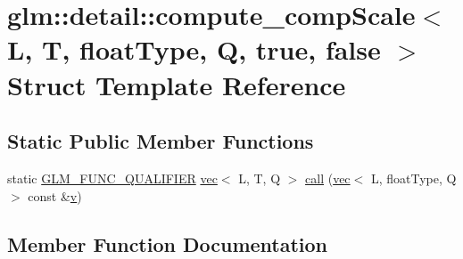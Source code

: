 \hypertarget{structglm_1_1detail_1_1compute__comp_scale_3_01_l_00_01_t_00_01float_type_00_01_q_00_01true_00_01false_01_4}{}\section{glm\+:\+:detail\+:\+:compute\+\_\+comp\+Scale$<$ L, T, float\+Type, Q, true, false $>$ Struct Template Reference}
\label{structglm_1_1detail_1_1compute__comp_scale_3_01_l_00_01_t_00_01float_type_00_01_q_00_01true_00_01false_01_4}
\subsection*{Static Public Member Functions}
\begin{DoxyCompactItemize}
\item 
static \mbox{\hyperlink{setup_8hpp_a33fdea6f91c5f834105f7415e2a64407}{G\+L\+M\+\_\+\+F\+U\+N\+C\+\_\+\+Q\+U\+A\+L\+I\+F\+I\+ER}} \mbox{\hyperlink{structglm_1_1vec}{vec}}$<$ L, T, Q $>$ \mbox{\hyperlink{structglm_1_1detail_1_1compute__comp_scale_3_01_l_00_01_t_00_01float_type_00_01_q_00_01true_00_01false_01_4_a6f43175330a561e484c39041fd204fb4}{call}} (\mbox{\hyperlink{structglm_1_1vec}{vec}}$<$ L, float\+Type, Q $>$ const \&\mbox{\hyperlink{_s_d_l__opengl_8h_a10a82eabcb59d2fcd74acee063775f90}{v}})
\end{DoxyCompactItemize}


\subsection{Member Function Documentation}
\mbox{\label{structglm_1_1detail_1_1compute__comp_scale_3_01_l_00_01_t_00_01float_type_00_01_q_00_01true_00_01false_01_4_a6f43175330a561e484c39041fd204fb4}} 
